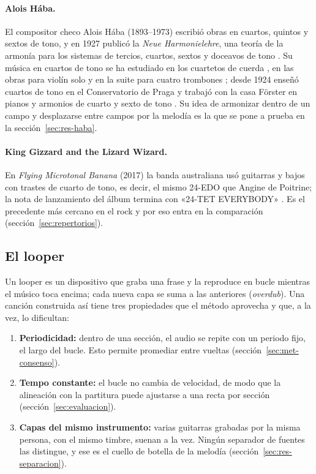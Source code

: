\paragraph{Alois Hába.} El compositor checo Alois Hába (1893--1973) escribió obras en cuartos, quintos y sextos de
tono, y en 1927 publicó la \emph{Neue Harmonielehre}, una teoría de la armonía para los sistemas de tercios, cuartos,
sextos y doceavos de tono \citep{haba1927,choroscian2018}. Su música en cuartos de tono se ha estudiado en los cuartetos
de cuerda \citep{choroscian2018}, en las obras para violín solo \citep{jin2015} y en la suite para cuatro trombones
\citep{skinner2006}; desde 1924 enseñó cuartos de tono en el Conservatorio de Praga y trabajó con la casa Förster en
pianos y armonios de cuarto y sexto de tono \citep{spurny2021}. Su idea de armonizar dentro de un campo y desplazarse
entre campos por la melodía es la que se pone a prueba en la sección~\ref{sec:res-haba}.

\paragraph{King Gizzard and the Lizard Wizard.} En \emph{Flying Microtonal Banana} (2017) la banda australiana usó
guitarras y bajos con trastes de cuarto de tono, es decir, el mismo 24-EDO que Angine de Poitrine; la nota de
lanzamiento del álbum termina con «24-TET EVERYBODY» \citep{kinggizzard2017}. Es el precedente más
cercano en el rock y por eso entra en la comparación (sección~\ref{sec:repertorios}).

\subsection{El looper}

Un looper es un dispositivo que graba una frase y la reproduce en bucle mientras el músico toca encima; cada nueva capa
se suma a las anteriores (\emph{overdub}). Una canción construida así tiene tres propiedades que el método aprovecha y
que, a la vez, lo dificultan:
\begin{enumerate}
  \item \textbf{Periodicidad:} dentro de una sección, el audio se repite con un periodo fijo, el largo del bucle. Esto
  permite promediar entre vueltas (sección~\ref{sec:met-consenso}).
  \item \textbf{Tempo constante:} el bucle no cambia de velocidad, de modo que la alineación con la partitura puede
  ajustarse a una recta por sección (sección~\ref{sec:evaluacion}).
  \item \textbf{Capas del mismo instrumento:} varias guitarras grabadas por la misma persona, con el mismo timbre, suenan a
  la vez. Ningún separador de fuentes las distingue, y ese es el cuello de botella de la melodía
  (sección~\ref{sec:res-separacion}).
\end{enumerate}

